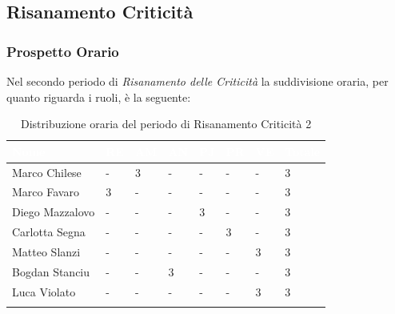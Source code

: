 \newpage
\subsection{Risanamento Criticità}
\label{PRC2}

\subsubsection{Prospetto Orario}
Nel secondo periodo di \textit{Risanamento delle Criticità} la suddivisione oraria, per quanto riguarda i ruoli, è la seguente: 


\begin{longtable}{|C{.30\textwidth}|C{.06\textwidth}|C{.06\textwidth}|C{.06\textwidth} | C{.06\textwidth}| C{.06\textwidth} | C{.06\textwidth} | C{.10\textwidth} |}
\hline
{}	\textbf{\textcolor{white}{Nome}} & \textbf{\textcolor{white}{RE}} & \textbf{\textcolor{white}{AM}} & \textbf{\textcolor{white}{AN}} & \textbf{\textcolor{white}{PJ}} & \textbf{\textcolor{white}{PR}} & \textbf{\textcolor{white}{VE}} & \textbf{\textcolor{white}{Totale}}\\
\hline 
Marco Chilese & - & 3 & - & - & - & - & 3 \\
\hline
{}Marco Favaro & 3 & - & - & - & - & - & 3 \\
\hline
Diego Mazzalovo & - & - & - & 3 & - & - & 3 \\
\hline
{}Carlotta Segna & - & - & - & - & 3 & - & 3 \\
\hline
Matteo Slanzi & - & - & - & - & - & 3 & 3 \\
\hline
{}Bogdan Stanciu & - & - & 3 & - & - & - & 3 \\
\hline
Luca Violato & - & - & - & - & - & 3 & 3 \\   
\hline


\caption{Distribuzione oraria del periodo di Risanamento Criticità 2}
\label{Distribuzione oraria rc2}
\end{longtable}

